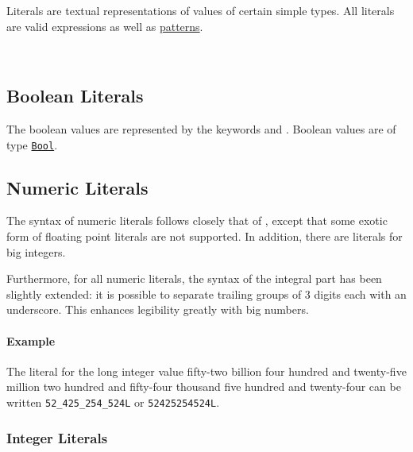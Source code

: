 Literals are textual representations of values of certain simple types. All literals are valid expressions as well as \hyperref[patterns]{patterns}.

\begin{flushleft}
  \oder{}  \alt{}  \oder{}  \oder{} \\
  \oder{} 
\end{flushleft}


\subsection{Boolean Literals} \label{boolliteral}

The boolean values are represented by the keywords  and . 
Boolean values are of type \hyperref[boolean]{\texttt{Bool}}.

\begin{flushleft}
  \oder{} 
\end{flushleft}

\subsection{Numeric Literals}

The syntax of numeric literals follows closely that of \java{}, except that some exotic form of floating point literals are not supported.
In addition, there are literals for big integers.

Furthermore, for all numeric literals, the syntax of the integral part has been slightly extended: it is possible to separate trailing groups of 3 digits each with an underscore. This enhances legibility greatly with big numbers.

\paragraph*{Example}
The literal for the long integer value fifty-two billion four hundred and twenty-five million two hundred and fifty-four thousand five hundred and twenty-four can be written \texttt{52\_425\_254\_524L} or \texttt{52425254524L}.


\subsubsection{Integer Literals}

